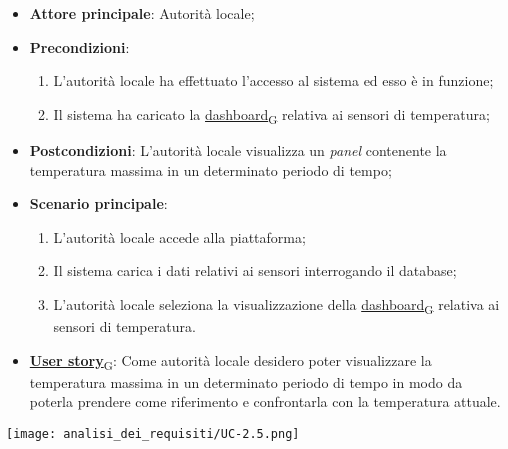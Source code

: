 \begin{itemize}
	\item \textbf{Attore principale}: Autorità locale;
	\item \textbf{Precondizioni}:
	      \begin{enumerate}
		      \item L'autorità locale ha effettuato l'accesso al sistema ed esso è in funzione;
		      \item Il sistema ha caricato la \href{https://7last.github.io/docs/rtb/documentazione-interna/glossario\#dashboard}{dashboard\textsubscript{G}} relativa ai sensori di temperatura;
	      \end{enumerate}
	\item \textbf{Postcondizioni}: L'autorità locale visualizza un \textit{panel} contenente la temperatura massima in un determinato periodo di tempo;
	\item \textbf{Scenario principale}:
	      \begin{enumerate}
		      \item L'autorità locale accede alla piattaforma;
		      \item Il sistema carica i dati relativi ai sensori interrogando il database;
		      \item L'autorità locale seleziona la visualizzazione della \href{https://7last.github.io/docs/rtb/documentazione-interna/glossario\#dashboard}{dashboard\textsubscript{G}} relativa ai sensori di temperatura.
	      \end{enumerate}
	\item \href{https://7last.github.io/docs/rtb/documentazione-interna/glossario\#user-story}{\textbf{User story}\textsubscript{G}}:
	      Come autorità locale desidero poter visualizzare la temperatura massima in un determinato periodo di tempo
	      in modo da poterla prendere come riferimento e confrontarla con la temperatura attuale.
\end{itemize}
\begin{center}
	\texttt{[image: analisi\_dei\_requisiti/UC-2.5.png]}
\end{center}

